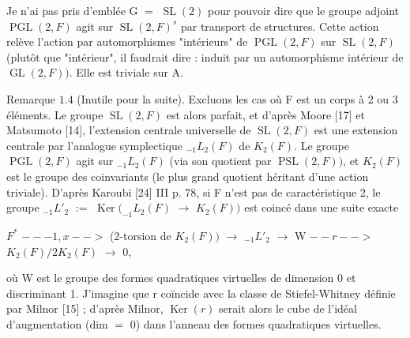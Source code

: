\documentclass[10pt,a4paper]{article}
\begin{document}
\par Je n'ai pas pris d'emblée G $=$ $\operatorname{SL}(2)$ pour pouvoir dire que le groupe adjoint $\operatorname{PGL}(2,F)$ agit sur $\operatorname{SL}(2,F)^s$ par transport de structures. Cette action relève l'action par automorphismes "intérieurs" de $\operatorname{PGL}(2,F)$ sur $\operatorname{SL}(2,F)$ (plutôt que "intérieur", il faudrait dire : induit par un automorphisme intérieur de $\operatorname{GL}(2,F))$. Elle est triviale sur A.\par
\par Remarque $1.4$ (Inutile pour la suite). Excluons les cas où F est un corps à 2 ou 3 éléments. Le groupe $\operatorname{SL}(2,F)$ est alors parfait, et d'après Moore [17] et Matsumoto [14], l'extension centrale universelle de $\operatorname{SL}(2,F)$ est une extension centrale par l'analogue symplectique $_{-1}L_2(F)$ de $K_2(F)$. Le groupe $\operatorname{PGL}(2,F)$ agit sur $_{-1}L_2(F)$ (via son quotient par $\operatorname{PSL}(2,F))$, et $K_2(F)$ est le groupe des coinvariants (le plus grand quotient héritant d'une action triviale). D'après Karoubi [24] III p. 78, si F n'est pas de caractéristique 2, le groupe $_{-1}L'_2$ $:=$ $\operatorname{Ker}(_{-1}L_2(F)$ $\to{}$ $K_2(F))$ est coincé dans une suite exacte\par
\par $F^*$ $--{-1,x}-->$ (2-torsion de $K_2(F))$ $\to{}$ $_{-1}L'_2$ $\to{}$ W $--r-->$ $K_2(F)/2K_2(F)$ $\to{}$ 0,\par
\par où W est le groupe des formes quadratiques virtuelles de dimension 0 et discriminant 1. J'imagine que r coïncide avec la classe de Stiefel-Whitney définie par Milnor [15] ; d'après Milnor, $\operatorname{Ker}(r)$ serait alors le cube de l'idéal d'augmentation (dim $=$ 0) dans l'anneau des formes quadratiques virtuelles.\par
\end{document}
